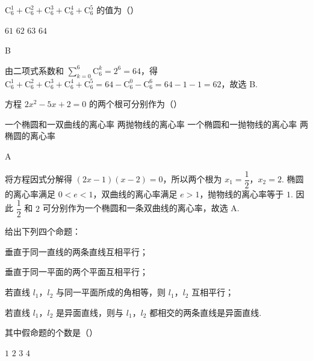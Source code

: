 \begin{problem}
\(\mathrm{C}_6^1 + \mathrm{C}_6^2 + \mathrm{C}_6^3 + \mathrm{C}_6^4 + \mathrm{C}_6^5\) 的值为（\quad）

\choices
    {\(61\)}
    {\(62\)}
    {\(63\)}
    {\(64\)}
\end{problem}

\begin{answer}
B
\end{answer}

\begin{solution}
由二项式系数和 \(\sum_{k=0}^{6}\mathrm C_6^k=2^6=64\)，得 \(\mathrm C_6^1+\mathrm C_6^2+\mathrm C_6^3+\mathrm C_6^4+\mathrm C_6^5=64-\mathrm C_6^0-\mathrm C_6^6=64-1-1=62\)，故选 B.
\end{solution}

\begin{problem}
方程 \(2x^{2} - 5x + 2 = 0\) 的两个根可分别作为（\quad）

\choices
    {一个椭圆和一双曲线的离心率}
    {两抛物线的离心率}
    {一个椭圆和一抛物线的离心率}
    {两椭圆的离心率}
\end{problem}

\begin{answer}
A
\end{answer}

\begin{solution}
将方程因式分解得 \((2x-1)(x-2)=0\)，所以两个根为 \(x_1=\dfrac{1}{2}\)，\(x_2=2\). 椭圆的离心率满足 \(0<e<1\)，双曲线的离心率满足 \(e>1\)，抛物线的离心率等于 \(1\). 因此 \(\dfrac{1}{2}\) 和 \(2\) 可分别作为一个椭圆和一条双曲线的离心率，故选 A.
\end{solution}

\begin{problem}
给出下列四个命题：

\begin{circlelist}
\item 垂直于同一直线的两条直线互相平行；
\item 垂直于同一平面的两个平面互相平行；
\item 若直线 \(l_{1}\)，\(l_{2}\) 与同一平面所成的角相等，则 \(l_{1}\)，\(l_{2}\) 互相平行；
\item 若直线 \(l_{1}\)，\(l_{2}\) 是异面直线，则与 \(l_{1}\)，\(l_{2}\) 都相交的两条直线是异面直线.
\end{circlelist}

其中假命题的个数是（\quad）

\choices
    {\(1\)}
    {\(2\)}
    {\(3\)}
    {\(4\)}
\end{problem}

